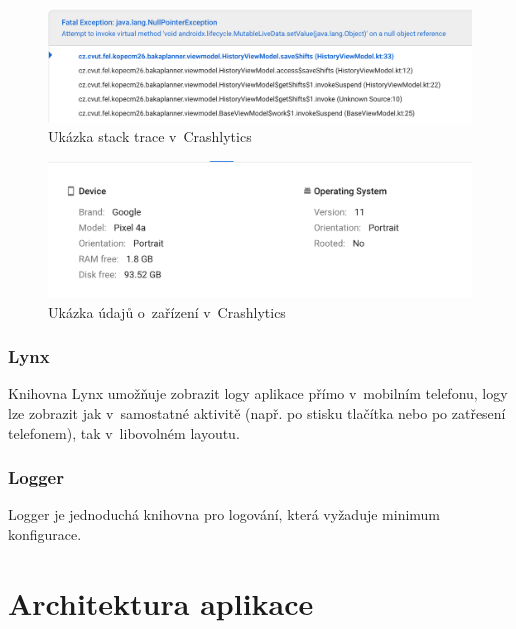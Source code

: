\documentclass[twoside]{ctuthesis}
\begin{document}
\begin{figure}[h!]
	\includegraphics[scale=.45]{img/crashlytics.png}
	\caption{Ukázka stack trace v~Crashlytics}
	\label{fig:crashlytics}
\end{figure}

\begin{figure}[h!]
	\includegraphics[scale=.45]{img/crashlytics_device.png}
	\caption{Ukázka údajů o~zařízení v~Crashlytics}
	\label{fig:crashlytics-device}
\end{figure}

\subsubsection{Lynx}
Knihovna Lynx umožňuje zobrazit logy aplikace přímo v~mobilním telefonu, logy lze zobrazit jak v~samostatné aktivitě (např. po stisku tlačítka nebo po zatřesení telefonem), tak v~libovolném layoutu. \cite{sanchez2020lynx}


\subsubsection{Logger}
Logger \cite{obut2020logger} je jednoduchá knihovna pro logování, která vyžaduje minimum konfigurace.

\newpage
\section{Architektura aplikace}
\end{document}
